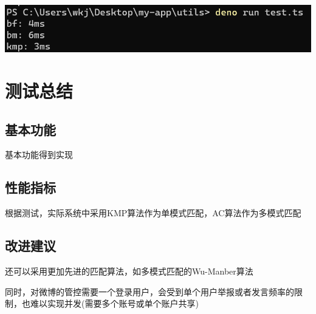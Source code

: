 \documentclass{ctexart}
\begin{document}
\includegraphics[width=\textwidth]{compare.png}

\section{测试总结}

\subsection{基本功能}

基本功能得到实现

\subsection{性能指标}

根据测试，实际系统中采用KMP算法作为单模式匹配，AC算法作为多模式匹配


\subsection{改进建议}
还可以采用更加先进的匹配算法，如多模式匹配的Wu-Manber算法

同时，对微博的管控需要一个登录用户，会受到单个用户举报或者发言频率的限制，也难以实现并发(需要多个账号或单个账户共享)
\end{document}

